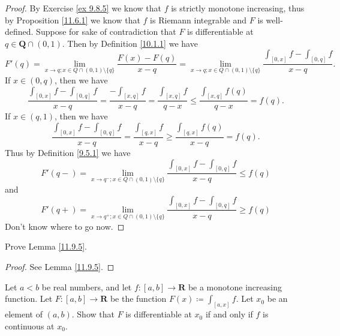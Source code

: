 \begin{proof}
    By Exercise \ref{ex 9.8.5} we know that \(f\) is strictly monotone increasing, thus by Proposition \ref{11.6.1} we know that \(f\) is Riemann integrable and \(F\) is well-defined.
    Suppose for sake of contradiction that \(F\) is differentiable at \(q \in \mathbf{Q} \cap (0, 1)\).
    Then by Definition \ref{10.1.1} we have
    \[
        F'(q) = \lim_{x \to q ; x \in Q \cap (0, 1) \setminus \{q\}} \frac{F(x) - F(q)}{x - q} = \lim_{x \to q ; x \in Q \cap (0, 1) \setminus \{q\}} \frac{\int_{[0, x]} f - \int_{[0, q]} f}{x - q}.
    \]
    If \(x \in (0, q)\), then we have
    \[
        \frac{\int_{[0, x]} f - \int_{[0, q]} f}{x - q} = \frac{-\int_{[x, q]} f}{x - q} = \frac{\int_{[x, q]} f}{q - x} \leq \frac{\int_{[x, q]} f(q)}{q - x} = f(q).
    \]
    If \(x \in (q, 1)\), then we have
    \[
        \frac{\int_{[0, x]} f - \int_{[0, q]} f}{x - q} = \frac{\int_{[q, x]} f}{x - q} \geq \frac{\int_{[q, x]} f(q)}{x - q} = f(q).
    \]
    Thus by Definition \ref{9.5.1} we have
    \[
        F'(q-) = \lim_{x \to q^- ; x \in Q \cap (0, 1) \setminus \{q\}} \frac{\int_{[0, x]} f - \int_{[0, q]} f}{x - q} \leq f(q)
    \]
    and
    \[
        F'(q+) = \lim_{x \to q^+ ; x \in Q \cap (0, 1) \setminus \{q\}} \frac{\int_{[0, x]} f - \int_{[0, q]} f}{x - q} \geq f(q)
    \]
    Don't know where to go now.
\end{proof}

\begin{exercise}\label{ex 11.9.2}
    Prove Lemma \ref{11.9.5}.
\end{exercise}

\begin{proof}
    See Lemma \ref{11.9.5}.
\end{proof}

\begin{exercise}\label{ex 11.9.3}
    Let \(a < b\) be real numbers, and let \(f : [a, b] \to \mathbf{R}\) be a monotone increasing function.
    Let \(F : [a, b] \to \mathbf{R}\) be the function \(F(x) \coloneqq \int_{[a, x]} f\).
    Let \(x_0\) be an element of \((a, b)\).
    Show that \(F\) is differentiable at \(x_0\) if and only if \(f\) is continuous at \(x_0\).
\end{exercise}
